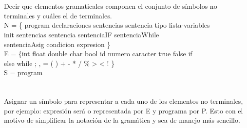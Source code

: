 \documentclass[a4paper,10pt]{article}
\begin{document}
\section{}
Decir que elementos gramaticales componen el conjunto de símbolos no  terminales
y cuáles el de terminales.\\

\noindent
N = \{ program declaraciones sentencias sentencia tipo lista-variables\\
\-\hspace{1cm}init sentencias sentencia sentenciaIF sentenciaWhile\\
\-\hspace{1cm}sentenciaAsig condicion expresion \}\\

\noindent
E = \{int float double char bool id numero caracter true false if\\
\-\hspace{1cm}else while ; , = ( ) { } + - * / \% > < ! \}\\

\noindent
S = program

\section{}
Asignar un símbolo para representar a cada uno de los elementos no
terminales, por ejemplo: expresión será o representada por E y programa por P.
Esto con el motivo de simplificar la notación de la gramática y sea de manejo
más sencillo.
\\
\end{document}
